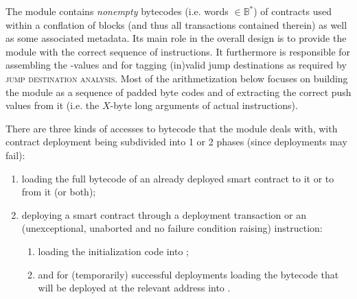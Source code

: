 
The \romMod{} module contains \emph{nonempty} bytecodes (i.e. words $\in\mathbb{B}^*$) of contracts used within a conflation of blocks (and thus all transactions contained therein) as well as some associated metadata.
Its main role in the overall design is to provide the \hubMod{} module with the correct sequence of instructions.
It furthermore is responsible for assembling the -values and for tagging (in)valid jump destinations as required by \textsc{jump destination analysis}.
Most of the arithmetization below focuses on building the \romMod{} module  as a sequence of padded byte codes and of extracting the correct push values from it (i.e. the $X$-byte long arguments of actual  instructions).

There are three kinds of accesses to bytecode that the \romMod{} module  deals with, with contract deployment being subdivided into 1 or 2 phases (since deployments may fail):
\begin{enumerate}
    \item loading the full bytecode of an already deployed smart contract to  it or to  from it (or both);
    \item deploying a smart contract through a deployment transaction or an (unexceptional, unaborted and no failure condition raising)  instruction:
        \begin{enumerate}
            \item loading the initialization code into \romMod{};
            \item and for (temporarily) successful deployments loading the bytecode that will be deployed at the relevant address into \romMod{}.
        \end{enumerate}
\end{enumerate}
